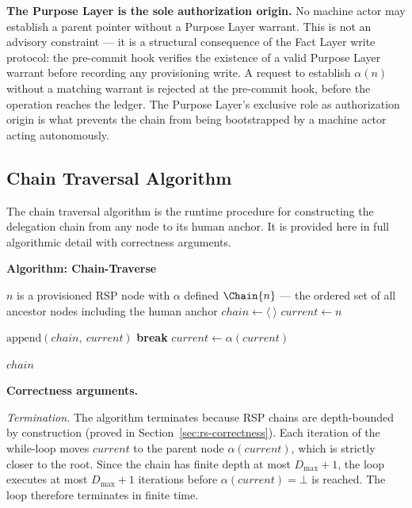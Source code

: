 \medskip
\noindent\textbf{The Purpose Layer is the sole authorization origin.} No machine actor may establish a parent pointer without a Purpose Layer warrant. This is not an advisory constraint — it is a structural consequence of the Fact Layer write protocol: the pre-commit hook verifies the existence of a valid Purpose Layer warrant before recording any provisioning write. A request to establish $\alpha(n)$ without a matching warrant is rejected at the pre-commit hook, before the operation reaches the ledger. The Purpose Layer's exclusive role as authorization origin is what prevents the chain from being bootstrapped by a machine actor acting autonomously.

\subsection{Chain Traversal Algorithm}
\label{sec:chain-traversal-algorithm}

The chain traversal algorithm is the runtime procedure for constructing the delegation chain from any node to its human anchor. It is provided here in full algorithmic detail with correctness arguments.

\medskip
\noindent\textbf{Algorithm: Chain-Traverse}

\begin{algorithm}
\caption{Chain-Traverse($n$) — Build the delegation chain from node $n$ to the human anchor}
\label{alg:chain-traverse}
\begin{algorithmic}[1]
\REQUIRE $n$ is a provisioned RSP node with $\alpha$ defined
\ENSURE $\Chain{n}$ — the ordered set of all ancestor nodes including the human anchor
\STATE $chain \leftarrow \langle\ \rangle$ 
\STATE $current \leftarrow n$ 

    \STATE $\text{append}(chain,\ current)$ 
        \STATE \textbf{break} 
    \ENDIF
    \STATE $current \leftarrow \alpha(current)$ 
\ENDWHILE

\RETURN $chain$
\end{algorithmic}
\end{algorithm}

\medskip
\noindent\textbf{Correctness arguments.}

\textit{Termination.} The algorithm terminates because RSP chains are depth-bounded by construction (proved in Section~\ref{sec:rs-correctness}). Each iteration of the while-loop moves $current$ to the parent node $\alpha(current)$, which is strictly closer to the root. Since the chain has finite depth at most $D_{\max} + 1$, the loop executes at most $D_{\max} + 1$ iterations before $\alpha(current) = \bot$ is reached. The loop therefore terminates in finite time.

